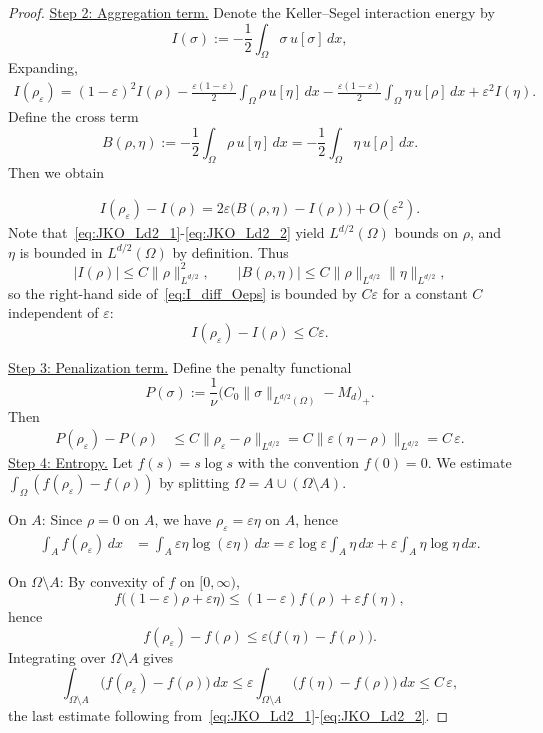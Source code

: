 \documentclass[a4paper,twosided, 11pt]{article}
\theoremstyle{plain}
\theoremstyle{remark}
\numberwithin{equation}{section}
\begin{document}
{\begin{proof}
\medskip
\underline{Step 2: Aggregation term.}
Denote the Keller--Segel interaction energy by
\[
I(\sigma):=-\frac12\int_\Omega \sigma\,u[\sigma]\,dx,
\]
Expanding,
\begin{align*}
I(\rho_\varepsilon)=(1-\varepsilon)^2 I(\rho)
-\frac{\varepsilon(1-\varepsilon)}2\int_\Omega \rho\,u[\eta]\,dx
-\frac{\varepsilon(1-\varepsilon)}2\int_\Omega \eta\,u[\rho]\,dx
+\varepsilon^2 I(\eta).
\end{align*}
Define the cross term
\[
B(\rho,\eta):=-\frac12\int_\Omega \rho\,u[\eta]\,dx=-\frac12\int_\Omega \eta\,u[\rho]\,dx.
\]
Then we obtain

\begin{align}
I(\rho_\varepsilon)-I(\rho)=2\varepsilon\bigl(B(\rho,\eta)-I(\rho)\bigr)+O(\varepsilon^2).\label{eq:I_diff_Oeps}
\end{align}
Note that~\eqref{eq:JKO_Ld2_1}-\eqref{eq:JKO_Ld2_2} yield $L^{d/2}(\Omega)$ bounds on $\rho$, and $\eta$ is bounded in $L^{d/2}(\Omega)$ by definition. Thus
\[
|I(\rho)|\le C\|\rho\|_{L^{d/2}}^2,\qquad |B(\rho,\eta)|\le C\|\rho\|_{L^{d/2}}\|\eta\|_{L^{d/2}},
\]
so the right-hand side of~\eqref{eq:I_diff_Oeps} is bounded by $C\varepsilon$ for a constant $C$ independent of $\varepsilon$:
\begin{equation}\label{eq:I_Oeps}
I(\rho_\varepsilon)-I(\rho)\le C\varepsilon.
\end{equation}

\medskip
\underline{Step 3: Penalization term.}
Define the penalty functional
\[
P(\sigma):=\frac{1}{\nu}\bigl(C_0\|\sigma\|_{L^{d/2}(\Omega)}-M_d\bigr)_+.
\]
Then
\begin{align}
P(\rho_\varepsilon)-P(\rho)
&\le C\|\rho_\varepsilon-\rho\|_{L^{d/2}}
= C\|\varepsilon(\eta-\rho)\|_{L^{d/2}}
= C\,\varepsilon.
\label{eq:penalty_Oeps}
\end{align}
\medskip
\underline{Step 4: Entropy.}
Let $f(s)=s\log s$ with the convention $f(0)=0$.
We estimate $\int_\Omega (f(\rho_\varepsilon)-f(\rho))$ by splitting $\Omega=A\cup(\Omega\setminus A)$.

\smallskip
On $A$:
Since $\rho=0$ on $A$, we have $\rho_\varepsilon=\varepsilon\eta$ on $A$, hence
\begin{align}
\int_A f(\rho_\varepsilon)\,dx
&=\int_A \varepsilon\eta\log(\varepsilon\eta)\,dx
=\varepsilon\log\varepsilon\int_A \eta\,dx+\varepsilon\int_A \eta\log\eta\,dx.
\label{eq:entropy_on_A}
\end{align}

On $\Omega\setminus A$:
By convexity of $f$ on $[0,\infty)$,
\[
f\bigl((1-\varepsilon)\rho+\varepsilon\eta\bigr)\le (1-\varepsilon)f(\rho)+\varepsilon f(\eta),
\]
hence
\[
f(\rho_\varepsilon)-f(\rho)\le \varepsilon\bigl(f(\eta)-f(\rho)\bigr).
\]
Integrating over $\Omega\setminus A$ gives
\begin{equation}\label{eq:entropy_off_A}
\int_{\Omega\setminus A}\bigl(f(\rho_\varepsilon)-f(\rho)\bigr)\,dx
\le \varepsilon\int_{\Omega\setminus A}\bigl(f(\eta)-f(\rho)\bigr)\,dx
\le C\,\varepsilon,
\end{equation}
the last estimate following from~\eqref{eq:JKO_Ld2_1}-\eqref{eq:JKO_Ld2_2}.


\end{proof}}
\end{document}
